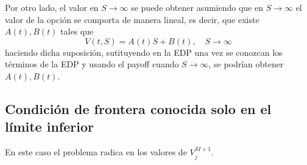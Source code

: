 Por otro lado, el valor en $S\to\infty$ se puede obtener asumiendo que en $S\to\infty$ el valor de la opción se comporta de manera lineal, es decir, que existe $A(t), B(t)$ tales que
\begin{equation*}
    V(t, S) = A(t) S + B(t), \quad S \to \infty
\end{equation*}
haciendo dicha suposición, sutituyendo en la EDP una vez se conozcan los términos de la EDP y usando el payoff cuando $S\to\infty$, se podrían obtener $A(t), B(t)$.




\subsection{Condición de frontera conocida solo en el límite inferior}\label{sec:DF_condicion_frontera_inferior_conocida}
En este caso el problema radica en los valores de $V_j^{M+1}$.

